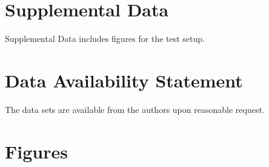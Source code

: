 \documentclass[utf8]{FrontiersinHarvard} %
\begin{document}
\section*{Supplemental Data}
Supplemental Data includes figures for the test setup. 
 

\section*{Data Availability Statement}
The data sets are available from the authors upon reasonable request.






\clearpage
\section*{Figures}

\end{document}

